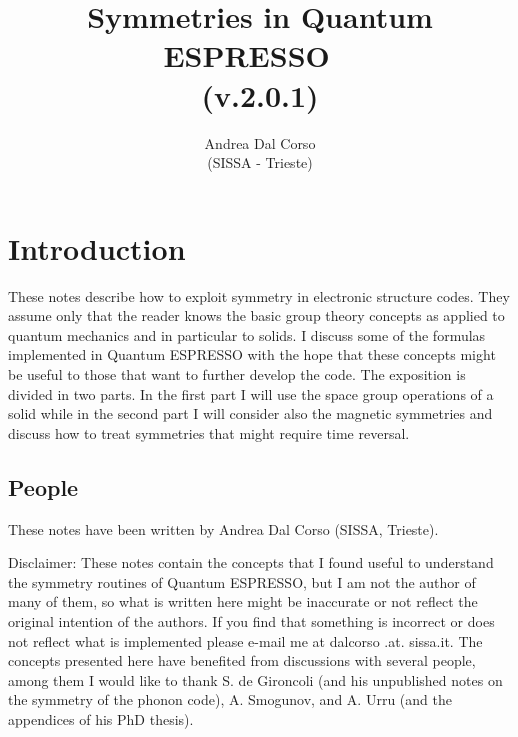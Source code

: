 \documentclass[12pt,a4paper,twoside]{report}
\def\version{2.0.1}
\begin{document}
\author{Andrea Dal Corso \\ (SISSA - Trieste)}
\date{}

\title{
  \vspace{3truecm}
  \Huge \color{dark-blue} Symmetries in Quantum ESPRESSO \ \\
   (v.\version)
}

\maketitle

\newpage

\tableofcontents

\newpage

\newpage
{\color{dark-blue}\chapter{Introduction}}
These notes describe how to exploit symmetry in electronic structure codes. They assume only that the reader knows the basic group theory concepts as applied to quantum mechanics and in particular to solids. I discuss some of the formulas implemented in Quantum ESPRESSO with the hope that these concepts might be useful to those that want to further develop the code. The exposition is divided in two parts. In the first part I will use the space group operations of a solid while in the second part I will consider also the magnetic symmetries and discuss how to treat symmetries that might require time reversal. 


\newpage
\section{People}
These notes have been written by Andrea Dal Corso (SISSA, Trieste). 

Disclaimer: These notes contain the concepts that I found useful to understand the symmetry routines of Quantum ESPRESSO, but I am not the author of many of them, so what is written here might be inaccurate or not reflect the original intention of the authors. If you find that something is incorrect or does not reflect what is implemented please e-mail me at dalcorso .at. sissa.it. 
The concepts presented here have benefited from discussions with several people, among them I would like to thank S. de Gironcoli (and his unpublished notes on the symmetry of the phonon code), A. Smogunov, and A. Urru (and the appendices of his PhD thesis). 
\end{document}
